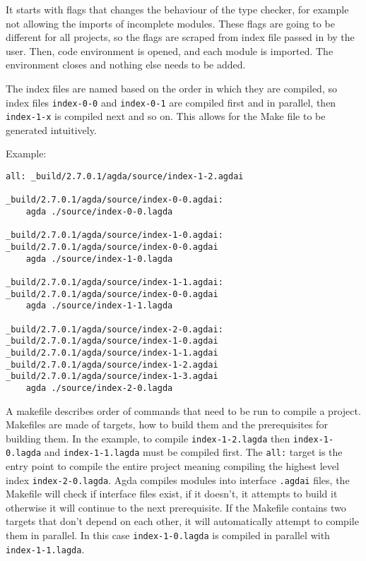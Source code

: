 It starts with flags that changes the behaviour of the type checker, for
example not allowing the imports of incomplete modules. These flags are going
to be different for all projects, so the flags are scraped from index file
passed in by the user. Then, code environment is opened, and each module is
imported. The environment closes and nothing else needs to be added.

The index files are named based on the order in which they are compiled, so
index files \texttt{index-0-0} and \texttt{index-0-1} are compiled first and in
parallel, then \texttt{index-1-x} is compiled next and so on. This allows for
the Make file to be generated intuitively. 

Example:

\begin{lstlisting}
all: _build/2.7.0.1/agda/source/index-1-2.agdai 

_build/2.7.0.1/agda/source/index-0-0.agdai: 
	agda ./source/index-0-0.lagda

_build/2.7.0.1/agda/source/index-1-0.agdai: _build/2.7.0.1/agda/source/index-0-0.agdai 
	agda ./source/index-1-0.lagda

_build/2.7.0.1/agda/source/index-1-1.agdai: _build/2.7.0.1/agda/source/index-0-0.agdai 
	agda ./source/index-1-1.lagda

_build/2.7.0.1/agda/source/index-2-0.agdai: _build/2.7.0.1/agda/source/index-1-0.agdai _build/2.7.0.1/agda/source/index-1-1.agdai _build/2.7.0.1/agda/source/index-1-2.agdai _build/2.7.0.1/agda/source/index-1-3.agdai 
	agda ./source/index-2-0.lagda
\end{lstlisting}

A makefile describes order of commands that need to be run to compile a
project. Makefiles are made of targets, how to build them and the prerequisites
for building them. In the example, to compile \texttt{index-1-2.lagda} then
\texttt{index-1-0.lagda} and \texttt{index-1-1.lagda} must be compiled first.
The \texttt{all:} target is the entry point to compile the entire project
meaning compiling the highest level index \texttt{index-2-0.lagda}. Agda
compiles modules into interface \texttt{.agdai} files, the Makefile will check
if interface files exist, if it doesn't, it attempts to build it otherwise it
will continue to the next prerequisite. If the Makefile contains two targets
that don't depend on each other, it will automatically attempt to compile them
in parallel. In this case \texttt{index-1-0.lagda} is compiled in parallel with
\texttt{index-1-1.lagda}.


